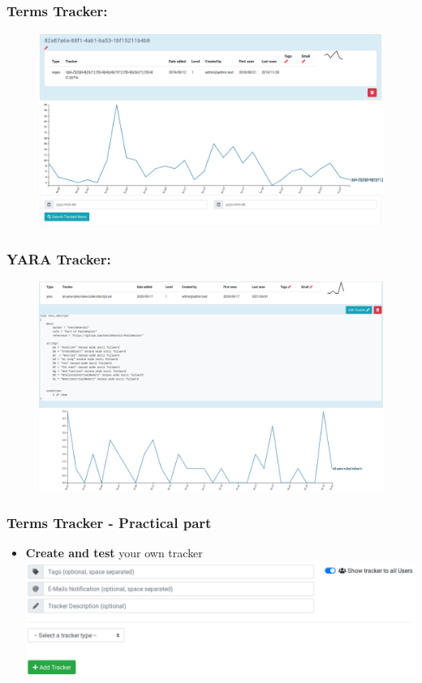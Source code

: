 \documentclass{beamer}
\begin{document}
\begin{frame}
    \frametitle{Terms Tracker:}
        \begin{figure}
            \includegraphics[scale=0.22]{images/term-tracker.png}
        \end{figure}
\end{frame}

\begin{frame}
    \frametitle{YARA Tracker:}
        \begin{figure}
            \includegraphics[scale=0.22]{screenshot/term-tracker-yara.png}
        \end{figure}
\end{frame}

\begin{frame}
    \frametitle{Terms Tracker - Practical part}
        \begin{itemize}
        	\item \textbf{Create and test} your own tracker
        	\includegraphics[scale=0.3]{images/term-tracker-create.png}
        \end{itemize}
\end{frame}
\end{document}

